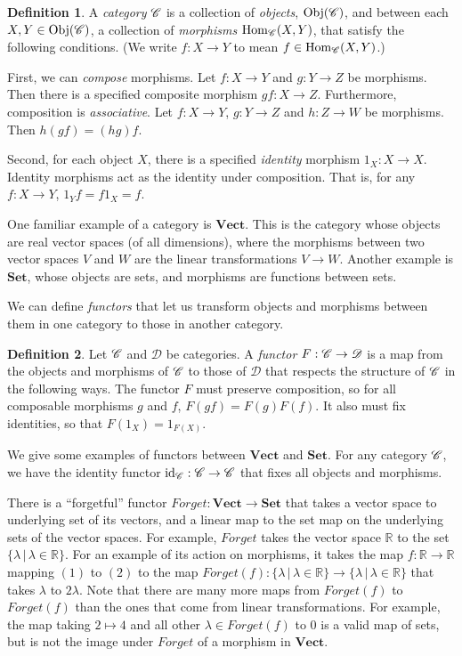 \documentclass[a4paper,11pt,leqno]{article} \usepackage{amsmath}
\newcommand{\RR}{\mathbb{R}} \newcommand{\QQ}{\mathbb{Q}}
\newcommand{\curD}{\mathscr{D}} \newcommand{\curI}{\mathscr{I}}
\newcommand{\id}{\ensuremath{\operatorname{id}}}
\newcommand{\Hom}{\ensuremath{\operatorname{Hom}}}
\newcommand{\Obj}{\ensuremath{\operatorname{Obj}}}
\theoremstyle{definition}
\newtheorem{defn}{Definition}
\begin{document}
\begin{defn}
  A \emph{category} $\mathscr{C}$ is a collection of \emph{objects}, $\Obj(\curC)$,
  and between each $X, Y\in\Obj(\curC)$, a collection of \emph{morphisms}
  $\Hom_{\curC}(X, Y)$, that satisfy the following conditions.
  (We write $f: X\to Y$ to mean $f\in \Hom_{\curC}(X, Y)$.)

  First, we can \emph{compose} morphisms.
  Let $f: X\to Y$ and $g: Y\to Z$ be morphisms.
  Then there is a specified composite morphism $gf: X\to Z$.
  Furthermore, composition is \emph{associative}.
  Let $f: X\to Y$, $g: Y\to Z$ and $h: Z\to W$ be morphisms.
  Then $h(gf) = (hg)f$.

  Second, for each object $X$, there is a specified \emph{identity} morphism
  $1_X: X\to X$.
  Identity morphisms act as the identity under composition.
  That is, for any $f: X\to Y$, $1_Yf = f1_X = f$.
\end{defn}

One familiar example of a category is $\textbf{Vect}$.
This is the category whose objects are real vector spaces (of all dimensions),
where the morphisms between two vector spaces $V$ and $W$ are the linear
transformations $V\to W$.
Another example is $\textbf{Set}$, whose objects are sets, and morphisms are
functions between sets.

We can define \emph{functors} that let us transform objects and morphisms between them in
one category to those in another category.

\begin{defn}
  Let $\mathscr{C}$ and $\curD$ be categories.
  A \emph{functor} $F: \curC\to \curD$ is a map from the objects and morphisms
  of $\mathscr{C}$ to those of $\curD$ that respects the structure of $\mathscr{C}$ in the
  following ways.
  The functor $F$ must preserve composition, so for all composable morphisms
  $g$ and $f$, $F(gf) = F(g)F(f)$.
  It also must fix identities, so that $F(1_X) = 1_{F(X)}$.
\end{defn}

We give some examples of functors between $\textbf{Vect}$ and $\textbf{Set}$.
For any category $\mathscr{C}$, we have the identity functor $\id_{\curC}:
\curC\to \curC$ that fixes all objects and morphisms.

There is a ``forgetful'' functor $Forget: \textbf{Vect}\to \textbf{Set}$ that
takes a vector space to underlying set of its vectors, and a linear map to the
set map on the underlying sets of the vector spaces.
For example, $Forget$ takes the vector space $\RR$ to the set $\{\lambda\,|\,
\lambda\in\RR\}$.
For an example of its action on morphisms, it takes the map $f: \RR\to\RR$
mapping $(1)$ to $(2)$ to the map
$Forget(f): \{\lambda\,|\,\lambda\in\RR\}\to \{\lambda\,|\,\lambda\in\RR\}$
that takes $\lambda$ to $2\lambda$.
Note that there are many more maps from $Forget(f)$ to $Forget(f)$ than the
ones that come from linear transformations.
For example, the map taking $2\mapsto 4$ and all other $\lambda\in Forget(f)$
to $0$ is a valid map of sets, but is not the image under $Forget$ of
a morphism in $\textbf{Vect}$.
\end{document}
